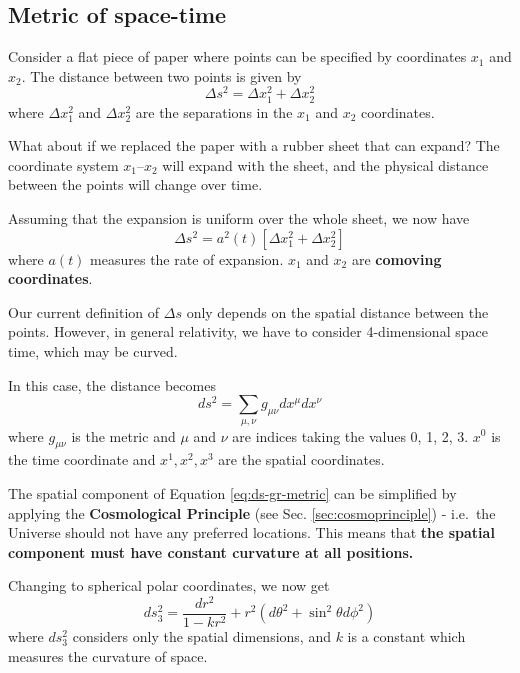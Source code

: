 \documentclass[11pt,a4paper,notoc]{tufte-handout}
\begin{document}
\hypertarget{sec:metric}{%
\subsection{Metric of space-time}\label{sec:metric}}

Consider a flat piece of paper where points can be specified by
coordinates \(x_1\) and \(x_2\). The distance between two points is given by
\begin{equation}
\Delta s^2 = \Delta x_{1}^{2} + \Delta x_{2}^{2}
\label{eq:dist01}
\end{equation}
where
\(\Delta x_{1}^{2}\) and \(\Delta x_{2}^{2}\) are the separations in the
\(x_1\) and \(x_2\) coordinates.

What about if we replaced the paper with a rubber sheet that can expand?
The coordinate system \(x_1\)--\(x_2\) will expand with the sheet, and the
physical distance between the points will change over time.

Assuming that the expansion is uniform over the whole sheet, we now have
\begin{equation}
\Delta s^2 = a^2(t)\left[\Delta x_{1}^{2} + \Delta x_{2}^{2}\right]
\label{eq:comoving01}
\end{equation}
where \(a(t)\) measures the rate of expansion. \(x_1\) and \(x_2\) are
\textbf{comoving coordinates}.

Our current definition of \(\Delta s\) only depends on the spatial
distance between the points. However, in general relativity, we have to
consider 4-dimensional space time, which may be curved.

In this case, the distance becomes
\begin{equation}
ds^2 = \sum_{\mu, \nu} g_{\mu\nu} dx^{\mu} dx^{\nu}
\label{eq:ds-gr-metric}
\end{equation}
where \(g_{\mu\nu}\) is the metric and \(\mu\) and \(\nu\) are indices taking
the values 0, 1, 2, 3. \(x^{0}\) is the time coordinate and
\(x^{1}, x^{2}, x^{3}\) are the spatial coordinates.

The spatial component of
Equation \eqref{eq:ds-gr-metric} can be simplified by applying the
\textbf{Cosmological Principle} (see Sec. \ref{sec:cosmoprinciple}) - i.e.~the Universe should not have any
preferred locations. This means that \textbf{the spatial component must have
constant curvature at all positions.}

Changing to spherical polar coordinates, we now get
\begin{equation}
ds^2_3 = \dfrac{dr^2}{1 - kr^2} + r^2\left(d\theta^2 + \sin^2\theta d\phi^2\right)
\label{eq:ds-gr-metric-polar}
\end{equation}
where \(ds_3^2\) considers only the spatial dimensions, and \(k\) is a
constant which measures the curvature of space.
\end{document}
